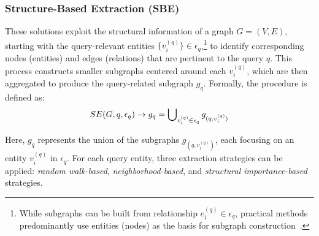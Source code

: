 \subsubsection{{\bf Structure-Based Extraction ({\bf SBE})}} 
\label{subsec:sbe}
These solutions exploit the structural information of a graph \( G = (V, E) \), starting with the query-relevant entities \( \{v_i^{(q)}\} \in \epsilon_q \),\footnote{While subgraphs can be built from relationship \( e_i^{(q)} \in \epsilon_q \), practical methods predominantly use entities (nodes) as the basis for subgraph construction~\cite{ref:kelp,ToG,ChatKBQA,GCR,LessIsMore}.} to identify corresponding nodes (entities) and edges (relations) that are pertinent to the query \( q \). This process constructs smaller subgraphs centered around each \( v_i^{(q)} \), which are then aggregated to produce the query-related subgraph \( g_q \). Formally, the procedure is defined as:
\begin{equation*}
\small
\ShortPreRetrieval(G, q, \epsilon_q) \rightarrow g_q = \bigcup\nolimits_{v_i^{(q)} \in \epsilon_q} g_{(q,v_i^{(q)})}
\vspace{-5pt}
\end{equation*}

Here, \( g_q \) represents the union of the subgraphs \(g_{(q,v_i^{(q)})} \), each focusing on an entity \( v_i^{(q)} \) in \( \epsilon_q \). For each query entity, three extraction strategies can be applied: {\it random walk-based}, {\it neighborhood-based}, and {\it structural importance-based} strategies.

